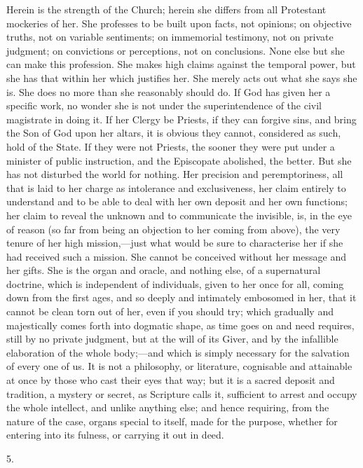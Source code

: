 Herein is the strength of the Church; herein she differs from all
Protestant mockeries of her. She professes to be built upon facts, not
opinions; on objective truths, not on variable sentiments; on
immemorial testimony, not on private judgment; on convictions or
perceptions, not on conclusions. None else but she can make this
profession. She makes high claims against the temporal power, but she
has that within her which justifies her. She merely acts out what she
says she is. She does no more than she reasonably should do. If God
has given her a specific work, no wonder she is not under the
superintendence of the civil magistrate in doing it. If her Clergy be
Priests, if they can forgive sins, and bring the Son of God upon her
altars, it is obvious they cannot, considered as such, hold of the
State. If they were not Priests, the sooner they were put under a
minister of public instruction, and the Episcopate abolished, the
better. But she has not disturbed the world for nothing. Her precision
and peremptoriness, all that is laid to her charge as intolerance and
exclusiveness, her claim entirely to understand and to be able to deal
with her own deposit and her own functions; her claim to reveal the
unknown and to communicate the invisible, is, in the eye of reason (so
far from being an objection to her coming from above), the very tenure
of her high mission,—just what would be sure to characterise her if
she had received such a mission. She cannot be conceived without her
message and her gifts. She is the organ and oracle, and nothing else,
of a supernatural doctrine, which is independent of individuals, given
to her once for all, coming down from the first ages, and so deeply
and intimately embosomed in her, that it cannot be clean torn out of
her, even if you should try; which gradually and majestically comes
forth into dogmatic shape, as time goes on and need requires, still by
no private judgment, but at the will of its Giver, and by the
infallible elaboration of the whole body;—and which is simply
necessary for the salvation of every one of us. It is not a
philosophy, or literature, cognisable and attainable at once by those
who cast their eyes that way; but it is a sacred deposit and
tradition, a mystery or secret, as Scripture calls it, sufficient to
arrest and occupy the whole intellect, and unlike anything else; and
hence requiring, from the nature of the case, organs special to
itself, made for the purpose, whether for entering into its fulness,
or carrying it out in deed.

5.

